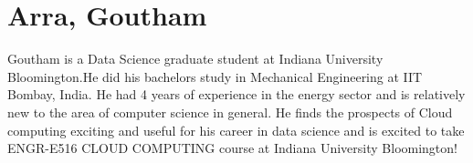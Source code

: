 \section{Arra, Goutham}

Goutham is a Data Science graduate student at Indiana University Bloomington.He
did his bachelors study in Mechanical Engineering at IIT Bombay, India. He had 4
years of experience in the energy sector and is relatively new to the area of
computer science in general. He finds the prospects of Cloud computing exciting
and useful for his career in data science and is excited to take ENGR-E516 CLOUD
COMPUTING course at Indiana University Bloomington!
